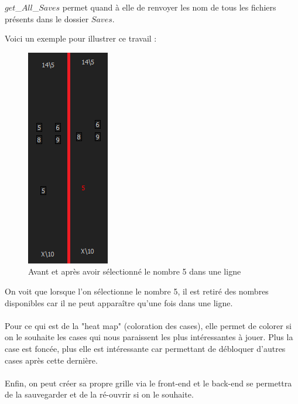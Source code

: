 \documentclass[12pt]{article}
\begin{document}
$get$\_$All$\_$Saves$ permet quand à elle de renvoyer les nom de tous les fichiers présents dans le dossier $Saves$.







\newpage
Voici un exemple pour illustrer ce travail : 
\begin{figure}[ht]
  \begin{center}
    \includegraphics[scale=0.5]{./ressources/retrait.png} 
  \end{center}
  \caption{Avant et après avoir sélectionné le nombre 5 dans une ligne}
\end{figure} 

On voit que lorsque l'on sélectionne le nombre 5, il est retiré des nombres disponibles car il ne peut apparaître qu'une fois dans une ligne. \\ \\
Pour ce qui est de la "heat map" (coloration des cases), elle permet de colorer si on le souhaite les cases qui nous paraissent les plus intéressantes à jouer. Plus la case est foncée, plus elle est intéressante car permettant de débloquer d'autres cases après cette dernière. \\ \\
Enfin, on peut créer sa propre grille via le front-end et le back-end se permettra de la sauvegarder et de la ré-ouvrir si on le souhaite. 
\newpage
\end{document}
